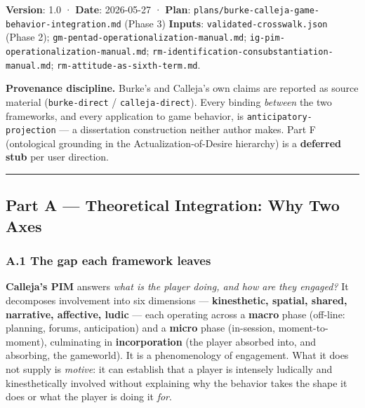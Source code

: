 \documentclass[11pt]{report}
\begin{document}
\textbf{Version}: 1.0 · \textbf{Date}: 2026-05-27 · \textbf{Plan}: \texttt{plans/\discretionary{}{}{}burke-\discretionary{}{}{}calleja-\discretionary{}{}{}game-\discretionary{}{}{}behavior-\discretionary{}{}{}integration.\discretionary{}{}{}md} (Phase 3) \textbf{Inputs}: \texttt{validated-\discretionary{}{}{}crosswalk.\discretionary{}{}{}json} (Phase 2); \texttt{gm-\discretionary{}{}{}pentad-\discretionary{}{}{}operationalization-\discretionary{}{}{}manual.\discretionary{}{}{}md}; \texttt{ig-\discretionary{}{}{}pim-\discretionary{}{}{}operationalization-\discretionary{}{}{}manual.\discretionary{}{}{}md}; \texttt{rm-\discretionary{}{}{}identification-\discretionary{}{}{}consubstantiation-\discretionary{}{}{}manual.\discretionary{}{}{}md}; \texttt{rm-\discretionary{}{}{}attitude-\discretionary{}{}{}as-\discretionary{}{}{}sixth-\discretionary{}{}{}term.\discretionary{}{}{}md}.


\textbf{Provenance discipline.} Burke's and Calleja's own claims are reported as source material (\texttt{burke-\discretionary{}{}{}direct} / \texttt{calleja-\discretionary{}{}{}direct}). Every binding \textit{between} the two frameworks, and every application to game behavior, is \texttt{anticipatory-\discretionary{}{}{}projection} — a dissertation construction neither author makes. Part F (ontological grounding in the Actualization-of-Desire hierarchy) is a \textbf{deferred stub} per user direction.


\vspace{0.4em}\hrule\vspace{0.8em}


\subsection{Part A — Theoretical Integration: Why Two Axes}


\subsubsection{A.1 The gap each framework leaves}


\textbf{Calleja's PIM} answers \textit{what is the player doing, and how are they engaged?} It decomposes involvement into six dimensions — \textbf{kinesthetic, spatial, shared, narrative, affective, ludic} — each operating across a \textbf{macro} phase (off-line: planning, forums, anticipation) and a \textbf{micro} phase (in-session, moment-to-moment), culminating in \textbf{incorporation} (the player absorbed into, and absorbing, the gameworld). It is a phenomenology of engagement. What it does not supply is \textit{motive}: it can establish that a player is intensely ludically and kinesthetically involved without explaining why the behavior takes the shape it does or what the player is doing it \textit{for}.
\end{document}
